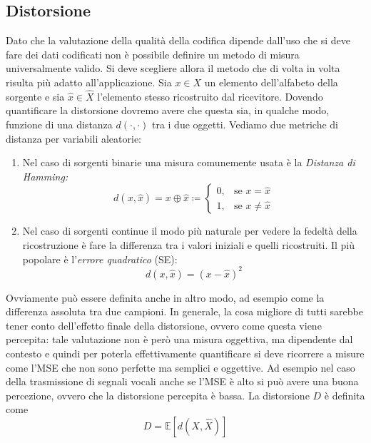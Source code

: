 \subsection{Distorsione}
Dato che la valutazione della qualità della codifica dipende dall’uso che si deve fare dei dati codificati non è possibile definire un metodo di misura universalmente valido. Si deve scegliere allora il metodo che di volta in volta risulta più adatto all’applicazione. Sia $x \in X$ un elemento dell'alfabeto della sorgente e sia $\hat{x} \in \hat{X}$ l'elemento stesso ricostruito dal ricevitore. Dovendo quantificare la distorsione dovremo avere che questa sia, in qualche modo, funzione di una distanza $d(\cdot, \cdot)$ tra i due oggetti. Vediamo due metriche di distanza per variabili aleatorie:
\begin{enumerate}
    \item Nel caso di sorgenti binarie una misura comunemente usata è la \textit{Distanza di Hamming:} \begin{equation}
        d(x, \hat{x}) = x \oplus \hat{x} \coloneqq \begin{cases}
        0, & \text{se } x = \hat{x} \\
        1, & \text{se } x \neq \hat{x}
        \end{cases}
    \end{equation}
    \item Nel caso di sorgenti continue il modo più naturale per vedere la fedeltà della ricostruzione è fare la differenza tra i valori iniziali e quelli ricostruiti. Il più popolare è l’\textit{errore quadratico} (SE):
    \begin{equation*}
        d(x, \hat{x}) = (x - \hat{x})^2
    \end{equation*}
\end{enumerate}
Ovviamente può essere definita anche in altro modo, ad esempio come la differenza assoluta tra due campioni. In
generale, la cosa migliore di tutti sarebbe tener conto dell’effetto finale della distorsione, ovvero come questa
viene percepita: tale valutazione non è per\`o una misura oggettiva, ma dipendente dal contesto e quindi per poterla effettivamente quantificare si deve ricorrere a misure come l’MSE che non sono perfette ma semplici e oggettive. Ad esempio nel caso della trasmissione di segnali vocali anche se l'MSE è alto si può avere una buona percezione, ovvero che la distorsione percepita è bassa.
 La distorsione $D$ \`e definita come
\begin{equation}
    D = \mathbb{E} [ d(X, \hat{X})]
\end{equation}
